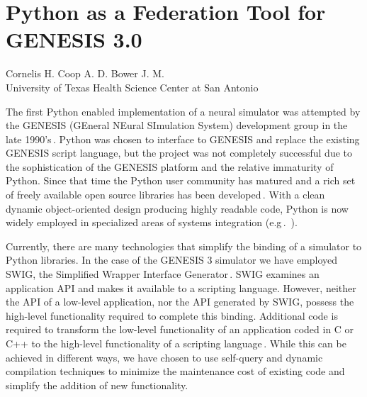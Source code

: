 \documentclass[12pt]{article}
\begin{document}


\section*{Python as a Federation Tool for GENESIS 3.0}

\vspace{1mm}
\begin{center}
  Cornelis H. \hspace{2mm} Coop A. D. \hspace{2mm} Bower J. M. \\
  {\small University of Texas Health Science Center at San Antonio}
\end{center}
\vspace{1mm}

The first Python enabled implementation of a neural simulator was
attempted by the GENESIS (GEneral NEural SImulation System)
development group in the late 1990's\,\cite{martelli06:_python_nutsh,
  vanier97:_genes_python}.  Python was chosen to interface to GENESIS
and replace the existing GENESIS script language, but the project was
not completely successful due to the sophistication of the GENESIS
platform and the relative immaturity of Python.  Since that time the
Python user community has matured and a rich set of freely available
open source libraries has been
developed\,\cite{langtangen04:_python_scrip_comput_scien}.  With a
clean dynamic object-oriented design producing highly readable code,
Python is now widely employed in specialized areas of systems
integration (e.g\,.~\cite{thiruvathukal01:_web_progr_python}).

Currently, there are many technologies that simplify the binding of a
simulator to Python libraries.  In the case of the GENESIS 3 simulator
we have employed SWIG, the Simplified Wrapper Interface
Generator\,\cite{08:_simpl_wrapp_inter_gener}.  SWIG examines an
application API and makes it available to a scripting language.
However, neither the API of a low-level application, nor the API
generated by SWIG, possess the high-level functionality required to
complete this binding.  Additional code is required to transform the
low-level functionality of an application coded in C or C++ to the
high-level functionality of a scripting
language\,\cite{08:_swig_python}.  While this can be achieved in
different ways, we have chosen to use self-query and dynamic
compilation techniques to minimize the maintenance cost of existing
code and simplify the addition of new functionality.
\end{document}

